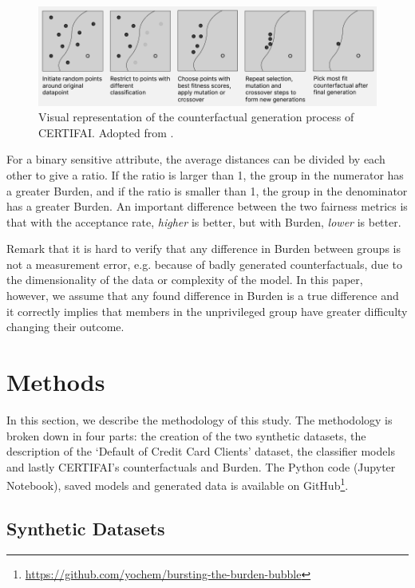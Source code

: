 \documentclass[runningheads]{llncs}
\begin{document}
\begin{figure}
    \centering
    \includegraphics[width=\textwidth]{img/counterfactual_generation.png}
    \caption{Visual representation of the counterfactual generation process of CERTIFAI. Adopted from \cite{certifai}.}
    \label{fig:cf-generation}
\end{figure}

For a binary sensitive attribute, the average distances can be divided by each other to give a ratio. If the ratio is larger than 1, the group in the numerator has a greater \gls{Burden}, and if the ratio is smaller than 1, the group in the denominator has a greater \gls{Burden}. An important difference between the two fairness metrics is that with the acceptance rate, \emph{higher} is better, but with Burden, \emph{lower} is better.

Remark that it is hard to verify that any difference in \gls{Burden} between groups is not a measurement error, e.g. because of badly generated counterfactuals, due to the dimensionality of the data or complexity of the model. In this paper, however, we assume that any found difference in Burden is a true difference and it correctly implies that members in the unprivileged group have greater difficulty changing their outcome.



\section{Methods}\label{sec:methods}
In this section, we describe the methodology of this study. The methodology is broken down in four parts: the creation of the two synthetic datasets, the description of the `Default of Credit Card Clients' dataset, the classifier models and lastly CERTIFAI's counterfactuals and Burden. The Python code (Jupyter Notebook), saved models and generated data is available on GitHub\footnote{\url{https://github.com/yochem/bursting-the-burden-bubble}}.

\subsection{Synthetic Datasets}\label{sec:syndata}
\end{document}
